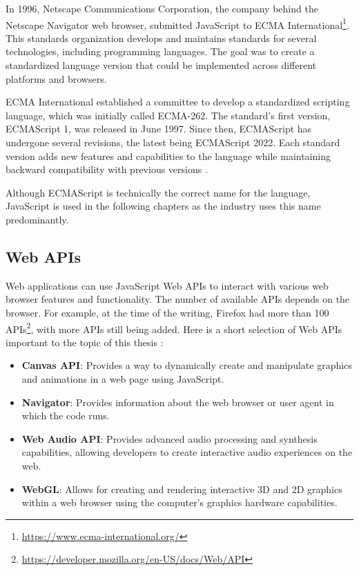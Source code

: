 In 1996, Netscape Communications Corporation, the company behind the Netscape Navigator web browser, submitted JavaScript to ECMA International\footnote{\url{https://www.ecma-international.org/}}. This standards organization develops and maintains standards for several technologies, including programming languages. The goal was to create a standardized language version that could be implemented across different platforms and browsers.

ECMA International established a committee to develop a standardized scripting language, which was initially called ECMA-262. The standard's first version, ECMAScript 1, was released in June 1997. Since then, ECMAScript has undergone several revisions, the latest being ECMAScript 2022. Each standard version adds new features and capabilities to the language while maintaining backward compatibility with previous versions \cite{JSDefinitiveGuide}.

Although ECMAScript is technically the correct name for the language, JavaScript is used in the following chapters as the industry uses this name predominantly.

\subsection{Web APIs}

Web applications can use JavaScript Web APIs to interact with various web browser features and functionality. The number of available APIs depends on the browser. For example, at the time of the writing, Firefox had more than 100 APIs\footnote{\url{https://developer.mozilla.org/en-US/docs/Web/API}}, with more APIs still being added. Here is a short selection of Web APIs important to the topic of this thesis \cite{SecurityWebDevs, SchauerDP}:

\begin{itemize}
	\item \textbf{Canvas API}: Provides a way to dynamically create and manipulate graphics and animations in a web page using JavaScript.
	\item \textbf{Navigator}: Provides information about the web browser or user agent in which the code runs.
	\item \textbf{Web Audio API}: Provides advanced audio processing and synthesis capabilities, allowing developers to create interactive audio experiences on the web.
	\item \textbf{WebGL}: Allows for creating and rendering interactive 3D and 2D graphics within a web browser using the computer's graphics hardware capabilities.
\end{itemize}


